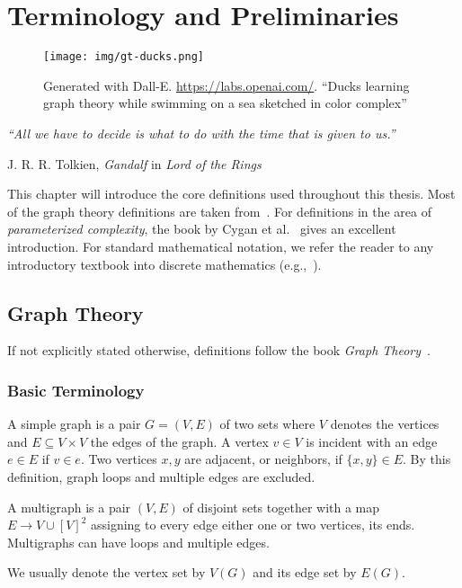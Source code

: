 \chapter{Terminology and Preliminaries}\label{ch:prelim}

\vspace*{-50pt}

\begin{figure}[ht]
        \texttt{[image: img/gt-ducks.png]}
        \captionsetup{textformat=empty,labelformat=blank}
        \caption[Generated with Dalle-E. Knowledge Cutoff 09-2022]{Generated with Dall-E. \url{https://labs.openai.com/}. ``Ducks learning graph theory while swimming on a sea sketched in color complex''}
\end{figure}

\epigraph{\itshape ``All we have to decide is what to do with the time that is given to us.''}{J. R. R. Tolkien, \textit{Gandalf} in \textit{Lord of the Rings}}


This chapter will introduce the core definitions used throughout this thesis. 
Most of the graph theory definitions are taken from~\cite{Diekert2005}. 
For definitions in the area of \textit{parameterized complexity}, the book by Cygan et al.~\cite{Cygan2015} gives an excellent introduction.
For standard mathematical notation, we refer the reader to any introductory textbook into discrete mathematics (e.g.,~\cite{Rosen2012}).
\section{Graph Theory}

If not explicitly stated otherwise, definitions follow the book \textit{Graph Theory}~\cite{diestel10}.

\subsection{Basic Terminology}

\begin{definition}[Graph]
    A simple graph is a pair $G = (V, E)$ of two sets where $V$ denotes the vertices and $E \subseteq V \times V$ the edges of the graph.  A vertex $v \in V$ is incident with an edge $e \in E$ if $v \in e$. Two vertices $x, y$ are adjacent, or neighbors, if $\{x,y \} \in E$. By this definition, graph loops and multiple edges are excluded.
    
    A multigraph is a pair $(V, E)$ of disjoint sets together with a map $E \rightarrow V \cup [V]^2$ assigning to every edge either one or two vertices, its ends. Multigraphs can have loops and multiple edges.
    
    We usually denote the vertex set by $V(G)$ and its edge set by $E(G)$.
\end{definition}

